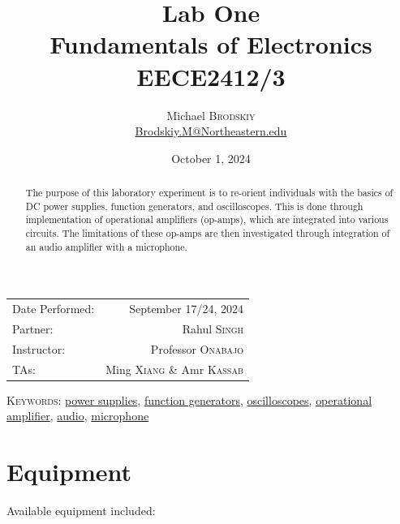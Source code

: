 \documentclass[
	letterpaper, %
	10pt, %
]{CSUniSchoolLabReport}
\title{Lab One\\ Fundamentals of Electronics \\ EECE2412/3} %
\author{Michael \textsc{Brodskiy}\\ \small \href{mailto:Brodskiy.M@Northeastern.edu}{Brodskiy.M@Northeastern.edu}}
\date{October 1, 2024} %
\begin{document}
\maketitle %

\begin{center}
	\begin{tabular}{l r}
		Date Performed: & September 17/24, 2024 \\ %
        Partner: & Rahul \textsc{Singh} \\ %
		Instructor: & Professor \textsc{Onabajo} \\ %
        TAs: & Ming \textsc{Xiang} \& Amr \textsc{Kassab} \\ %
	\end{tabular}
\end{center}

\newpage

\begin{abstract}

  The purpose of this laboratory experiment is to re-orient individuals with the basics of DC power supplies, function generators, and oscilloscopes. This is done through implementation of operational amplifiers (op-amps), which are integrated into various circuits. The limitations of these op-amps are then investigated through integration of an audio amplifier with a microphone.

\end{abstract}

\begin{flushleft}

  \textsc{Keywords:} \underline{power supplies}, \underline{function generators}, \underline{oscilloscopes}, \underline{operational amplifier}, \underline{audio}, \underline{microphone}

\end{flushleft}

\newpage

\tableofcontents

\newpage

\section{Equipment}

Available equipment included:\\
\end{document}
